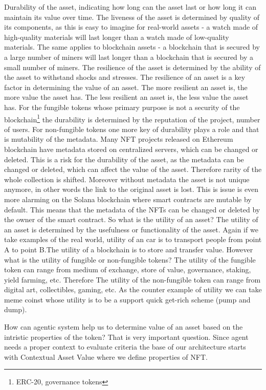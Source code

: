 Durability of the asset, indicating how long can the asset last or how long it can maintain its value over time.
The liveness of the asset is determined by quality of its components, as this is easy to imagine for real-world assets - a watch made of high-quality materials will last longer than a watch made of low-quality materials. The same applies to blockchain assets - a blockchain that is secured by a large number of miners will last longer than a blockchain that is secured by a small number of miners. The resilience of the asset is determined by the ability of the asset to withstand shocks and stresses. The resilience of an asset is a key factor in determining the value of an asset. The more resilient an asset is, the more value the asset has. The less resilient an asset is, the less value the asset has.
For the fungible tokens whose primary purpose is not a security of the blockchain\footnote{ERC-20, governance tokens} the durability is determined by the reputation of the project, number of users. For non-fungible tokens one more key of durability plays a role and that is mutability of the metadata. Many NFT projects released on Ethereum blockchain have metadata stored on centralized servers, which can be changed or deleted. This is a risk for the durability of the asset, as the metadata can be changed or deleted, which can affect the value of the asset. Therefore rarity of the whole collection is shifted. Moreover without metadata the asset is not unique anymore, in other words the link to the original asset is lost.
This is issue is even more alarming on the Solana blockchain where smart contracts are mutable by default. This means that the metadata of the NFTs can be changed or deleted by the owner of the smart contract.
So what is the utility of an asset? The utility of an asset is determined by the usefulness or functionality of the asset.
Again if we take examples of the real world, utility of an car is to transport people from point A to point B.The utility of a blockchain is to store and transfer value. However what is the utility of fungible or non-fungible tokens? The utility of the fungible token can range from medium of exchange, store of value, governance, staking, yield farming, etc. Therefore
The utility of the non-fungible token can range from digital art, collectibles, gaming, etc. As the counter example of utility we can take meme coinst whose utility is to be a support quick get-rich scheme (pump and dump).


How can agentic system help us to determine value of an asset based on the intristic properties of the token? That is very important question. Since agent needs a proper context to evaluate criteria the base of our architecture starts with Contextual Asset Value where we define properties of NFT.

